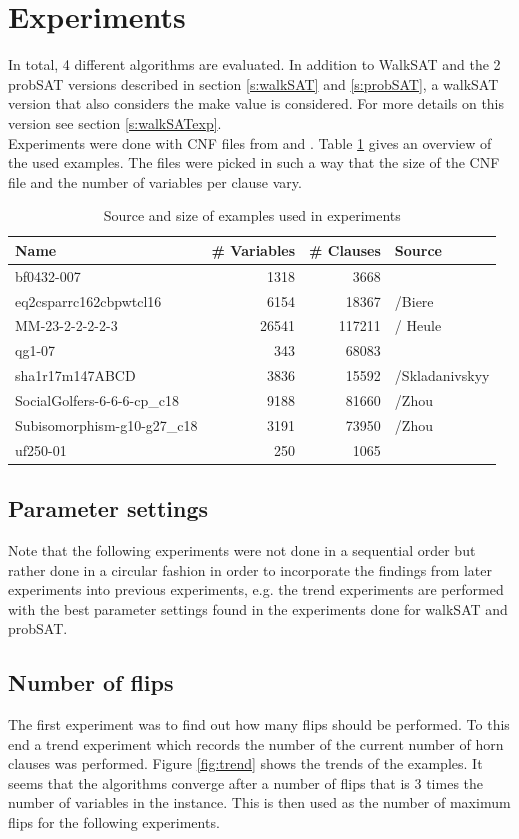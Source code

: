 \documentclass[12pt,a4paper]{article}
\begin{document}
\section{Experiments}
In total, 4 different algorithms are evaluated. In addition to WalkSAT and the 2 probSAT versions described in section \ref{s:walkSAT} and \ref{s:probSAT}, a walkSAT version that also considers the make value is considered. For more details on this version see section \ref{s:walkSATexp}.\\

Experiments were done with CNF files from \cite{sat_race_2019} and \cite{satlib_benchmark}. Table \ref{tab:ex} gives an overview of the used examples. The files were picked in such a way that the size of the CNF file and the number of variables per clause vary.
\begin{table}[h]
  \begin{tabular}{lrrl}
    Name & \# Variables & \# Clauses & Source\\
    \hline
    bf0432-007 & 1318 & 3668 & \cite{satlib_benchmark}\\
    eq2csparrc162cbpwtcl16 & 6154 & 18367 & \cite{sat_race_2019}/Biere\\
    MM-23-2-2-2-2-3 & 26541 & 117211 & \cite{sat_race_2019}/ Heule\\
    qg1-07 & 343 & 68083 & \cite{satlib_benchmark}\\
    sha1r17m147ABCD & 3836 & 15592 & \cite{sat_race_2019}/Skladanivskyy \\
    SocialGolfers-6-6-6-cp\_c18 & 9188 & 81660 & \cite{sat_race_2019}/Zhou\\
    Subisomorphism-g10-g27\_c18 & 3191 & 73950 & \cite{sat_race_2019}/Zhou \\
    uf250-01 & 250 & 1065 & \cite{satlib_benchmark} 
  \end{tabular}
  \caption{Source and size of examples used in experiments}
  \label{tab:ex}
\end{table}
\subsection{Parameter settings}
Note that the following experiments were not done in a sequential order but rather done in a circular fashion in order to incorporate the findings from later experiments into previous experiments, e.g. the trend experiments are performed with the best parameter settings found in the experiments done for walkSAT and probSAT.
\subsection{Number of flips}
The first experiment was to find out how many flips should be performed. To this end a trend experiment which records the number of the current number of horn clauses was performed. Figure \ref{fig:trend} shows the trends of the examples. It seems that the algorithms converge after a number of flips that is 3 times the number of variables in the instance. This is then used as the number of maximum flips for the following experiments.\\
\end{document}
